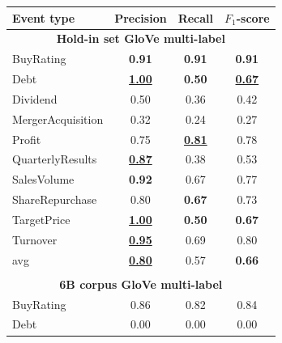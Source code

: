 \documentclass[11pt,a4paper]{article}
\begin{document}
\begin{table}[!htb]
	\centering
	\small{
		\begin{tabular}{p{2.8cm} c c c} 
			\textbf{Event type}  & \textbf{Precision}        & \textbf{Recall}           & \textbf{$F_1$-score}       \\
			\hline
			\multicolumn{4}{c}{\textbf{Hold-in set GloVe multi-label} } \\
			\hline
			BuyRating            & \textbf{0.91}             & \textbf{0.91}             & \textbf{0.91}              \\
			Debt                 & \underline{\textbf{1.00}} & \textbf{0.50}             & \underline{\textbf{0.67}}  \\
			Dividend             & 0.50                      & 0.36                      & 0.42                       \\
			MergerAcquisition    & 0.32                      & 0.24                      & 0.27                       \\
			Profit               & 0.75                      & \underline{\textbf{0.81}} & 0.78                       \\
			QuarterlyResults     & \underline{\textbf{0.87}} & 0.38                      & 0.53                       \\
			SalesVolume          & \textbf{0.92}             & 0.67                      & 0.77                       \\
			ShareRepurchase      & 0.80                      & \textbf{0.67}             & 0.73                       \\
			TargetPrice          & \underline{\textbf{1.00}} & \textbf{0.50}             & \textbf{0.67}              \\
			Turnover             & \underline{\textbf{0.95}} & 0.69                      & 0.80                       \\
			\hdashline
			avg                  & \underline{\textbf{0.80}} & 0.57                      & \textbf{0.66}              \\
			\\
			\multicolumn{4}{c}{\textbf{6B corpus GloVe multi-label} } \\
			\hline
			BuyRating            & 0.86                      & 0.82                      & 0.84                       \\
			Debt                 & 0.00                      & 0.00                      & 0.00                       \\

\end{tabular}}
\end{table}
\end{document}
